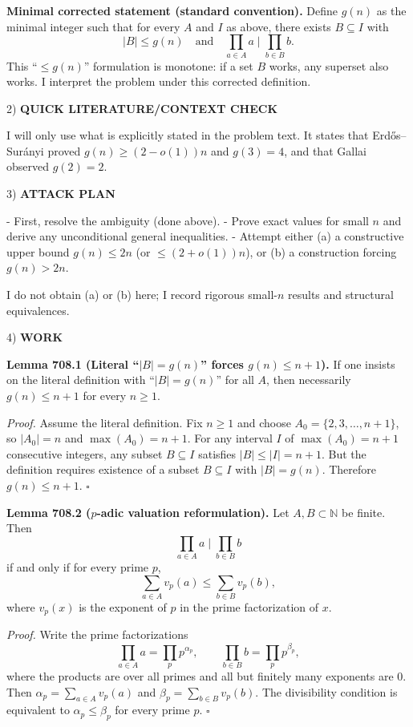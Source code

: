 \textbf{Minimal corrected statement (standard convention).}
Define $g(n)$ as the minimal integer such that for every $A$ and $I$ as above, there exists $B\subseteq I$ with
\[
|B|\le g(n)\quad\text{and}\quad \prod_{a\in A} a\mid \prod_{b\in B} b.
\]
This ``$\le g(n)$'' formulation is monotone: if a set $B$ works, any superset also works.
I interpret the problem under this corrected definition.

2) \textbf{QUICK LITERATURE/CONTEXT CHECK}

I will only use what is explicitly stated in the problem text.
It states that Erd\H{o}s--Sur\'anyi proved $g(n)\ge (2-o(1))n$ and $g(3)=4$, and that Gallai observed $g(2)=2$.

3) \textbf{ATTACK PLAN}

- First, resolve the ambiguity (done above).
- Prove exact values for small $n$ and derive any unconditional general inequalities.
- Attempt either (a) a constructive upper bound $g(n)\le 2n$ (or $\le (2+o(1))n$), or (b) a construction forcing $g(n)>2n$.

I do not obtain (a) or (b) here; I record rigorous small-$n$ results and structural equivalences.

4) \textbf{WORK}

\textbf{Lemma 708.1 (Literal ``$|B|=g(n)$'' forces $g(n)\le n+1$).}
If one insists on the literal definition with ``$|B|=g(n)$'' for all $A$, then necessarily $g(n)\le n+1$ for every $n\ge 1$.

\textit{Proof.}
Assume the literal definition.
Fix $n\ge 1$ and choose $A_0=\{2,3,\dots,n+1\}$, so $|A_0|=n$ and $\max(A_0)=n+1$.
For any interval $I$ of $\max(A_0)=n+1$ consecutive integers, any subset $B\subseteq I$ satisfies $|B|\le |I|=n+1$.
But the definition requires existence of a subset $B\subseteq I$ with $|B|=g(n)$.
Therefore $g(n)\le n+1$.
\hfill$\square$

\textbf{Lemma 708.2 ($p$-adic valuation reformulation).}
Let $A,B\subset\mathbb{N}$ be finite. Then
\[
\prod_{a\in A} a\mid \prod_{b\in B} b
\]
if and only if for every prime $p$,
\[
\sum_{a\in A} v_p(a)\le \sum_{b\in B} v_p(b),
\]
where $v_p(x)$ is the exponent of $p$ in the prime factorization of $x$.

\textit{Proof.}
Write the prime factorizations
\[
\prod_{a\in A} a=\prod_p p^{\alpha_p},\qquad \prod_{b\in B} b=\prod_p p^{\beta_p},
\]
where the products are over all primes and all but finitely many exponents are $0$.
Then $\alpha_p=\sum_{a\in A} v_p(a)$ and $\beta_p=\sum_{b\in B} v_p(b)$.
The divisibility condition is equivalent to $\alpha_p\le \beta_p$ for every prime $p$.
\hfill$\square$

